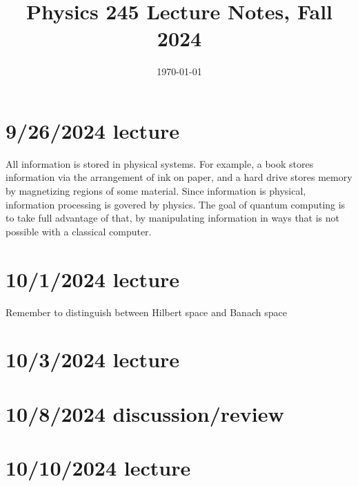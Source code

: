 \documentclass{article}
\date{\today}
\title{Physics 245 Lecture Notes, Fall 2024}
\begin{document}
\maketitle
{}

\tableofcontents

\section{9/26/2024 lecture}
\noindent{}\bigskip\par
All information is stored in physical systems. For example, a book stores information via the arrangement of ink on paper, and a hard drive stores memory by magnetizing regions of some material. Since information is physical, information processing is govered by physics. The goal of quantum computing is to take full advantage of that, by manipulating information in ways that is not possible with a classical computer.

\section{10/1/2024 lecture}
Remember to distinguish between Hilbert space and Banach space

\section{10/3/2024 lecture}

\section{10/8/2024 discussion/review}

\section{10/10/2024 lecture}
\end{document}
